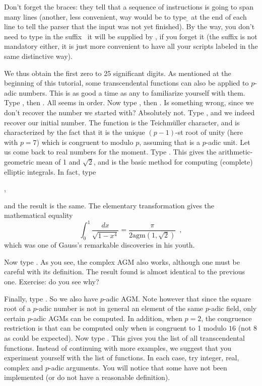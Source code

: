 Don't forget the braces: they tell  that a sequence of instructions is going
to span many lines (another, less convenient, way would be to type \b{} at the
end of each line to tell the parser that the input was not yet finished).
By the way, you don't need to type in the suffix~ it will be
supplied by , if you forget it (the suffix is not mandatory either, it is
just more convenient to have all your  scripts labeled in the same
distinctive way).

We thus obtain the first zero to 25 significant digits.
\medskip
%
As mentioned at the beginning of this tutorial, some transcendental functions
can also be applied to $p$-adic numbers. This is as good a time as any to
familiarize yourself with them. Type , then
. All seems in order. Now type ,
then . Is something wrong, since we don't recover the number we
started with? Absolutely not. Type
 ,
and we indeed recover our initial number. The function 
is the Teichm\"uller character, and is characterized by the fact that it is
the unique \hbox{$(p-1)$-st} root of unity (here with $p=7$) which is
congruent to  modulo $p$, assuming that  is a $p$-adic
unit.\smallskip
%
Let us come back to real numbers for the moment. Type .
This gives the arithmetic-geometric mean of 1 and $\sqrt2$, and is the basic
method for computing (complete) elliptic integrals. In fact, type

,

\noindent and the result is the same. The elementary transformation
 gives the mathematical equality
$$\int_0^1 \dfrac{dx}{\sqrt{1-x^4}} = \dfrac{\pi}{2\text{agm}(1,\sqrt2)}
\enspace,$$
which was one of Gauss's remarkable discoveries in his youth.

Now type . As you see, the complex AGM also works,
although one must be careful with its definition. The result found is
almost identical to the previous one. Exercise: do you see why?

Finally, type . So we also have $p$-adic
AGM. Note however that since the square root of a $p$-adic number is not
in general an element of the same $p$-adic field,
only certain $p$-adic AGMs can be computed. In addition,
when $p=2$, the congruence restriction is that  can be computed
only when  is congruent to 1 modulo $16$ (not 8 as could be
expected).\smallskip
%
Now type . This gives you the list of all transcendental functions.
Instead of continuing with more examples, we suggest that you experiment
yourself with the list of functions. In each case, try integer, real, complex
and $p$-adic arguments. You will notice that some have not been implemented
(or do not have a reasonable definition).

